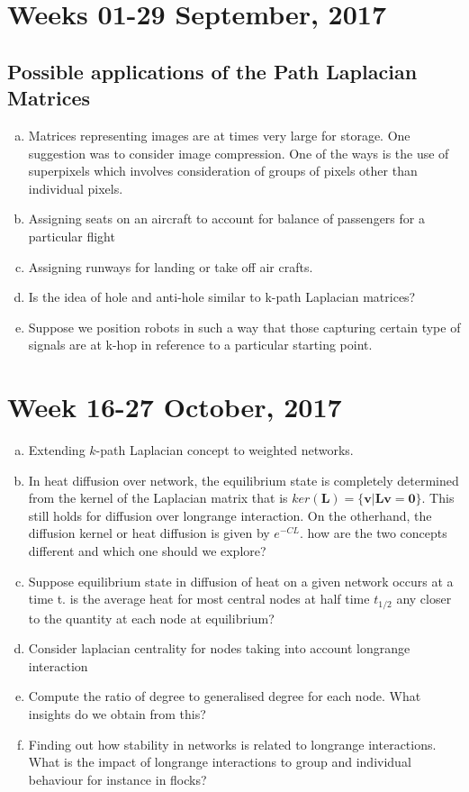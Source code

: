 \documentclass[10pt,a4paper]{article}
\begin{document}
\section{Weeks 01-29 September, 2017}
\subsection{Possible applications of the Path Laplacian Matrices}
\begin{enumerate}[a)]
	\item Matrices representing images are at times very large for storage. One suggestion was to consider image compression. One of the ways is the use of superpixels which involves consideration of groups of pixels other than individual pixels.
	\item Assigning seats on an aircraft to account for balance of passengers for a particular flight
	\item Assigning runways for landing or take off air crafts.
	\item Is the idea of hole and anti-hole similar to k-path Laplacian matrices?
	\item Suppose we position robots in such a way that those capturing certain type of signals are at k-hop in reference to a particular starting point.
\end{enumerate}

\newpage

\section*{Week 16-27 October, 2017}
\begin{enumerate}[a)]
	\item Extending $k$-path Laplacian concept to weighted networks.
	\item In heat diffusion over network, the equilibrium state is completely determined from the kernel of the Laplacian matrix that is $ker(\mathbf{L}) = \{\mathbf{v} | \mathbf{L}\mathbf{v}= \mathbf{0}\}$. This still holds for diffusion over longrange interaction. On the otherhand, the diffusion kernel or heat diffusion is given by $e^{-CL}$. how are the two concepts different and which one should we explore?
	\item Suppose equilibrium state in diffusion of heat on a given network occurs at a time t. is the average heat for most central nodes at half time $t_{1/2}$ any closer to the quantity at each node at equilibrium?
	\item Consider laplacian centrality for nodes taking into account longrange interaction
	\item Compute the ratio of degree to generalised degree for each node. What insights do we obtain from this?
	\item Finding out how stability in networks is related to longrange interactions. What is the impact of longrange interactions to group and individual behaviour for instance in flocks?
	
\end{enumerate}
\end{document}
